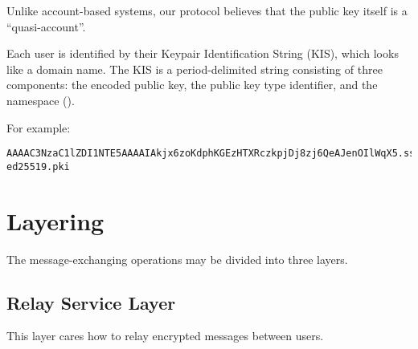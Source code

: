 Unlike account-based systems, our protocol believes that the public key itself is a ``quasi-account''.

Each user is identified by their Keypair Identification String (KIS), which looks like a domain name.
The KIS is a period-delimited string consisting of three components: the encoded public key,
the public key type identifier, and the namespace ().

For example:

\begin{lstlisting}
AAAAC3NzaC1lZDI1NTE5AAAAIAkjx6zoKdphKGEzHTXRczkpjDj8zj6QeAJenOIlWqX5.ssh-ed25519.pki
\end{lstlisting}












\section{Layering}

The message-exchanging operations may be divided into three layers.


\subsection{Relay Service Layer}

This layer cares how to relay encrypted messages between users.


